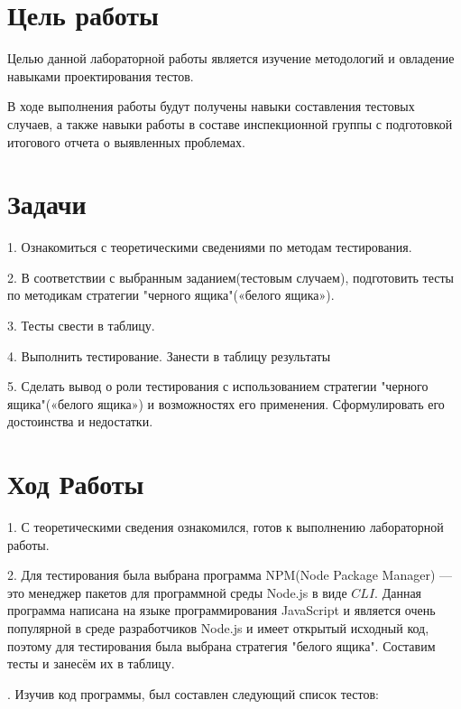 \documentclass[12pt]{article}
\begin{document}
    \section*{Цель работы}

    Целью данной лабораторной работы является изучение методологий и овладение навыками проектирования тестов.

    В ходе выполнения работы будут получены навыки составления тестовых случаев, а также навыки работы в составе инспекционной группы с подготовкой итогового отчета о выявленных проблемах.

    \section*{Задачи}

    1. Ознакомиться с теоретическими сведениями по методам тестирования.

    2. В соответствии с выбранным заданием(тестовым случаем), подготовить тесты по методикам стратегии "черного ящика"(«белого ящика»).

    3. Тесты свести в таблицу.

    4. Выполнить тестирование. Занести в таблицу результаты

    5. Сделать вывод о роли тестирования с использованием стратегии "черного ящика"(«белого ящика») и возможностях его применения. Сформулировать его достоинства и недостатки.

    \section*{Ход Работы}
    1. С теоретическими сведения ознакомился, готов к выполнению лабораторной работы.

    2. Для тестирования была выбрана программа NPM(Node Package Manager) --- это менеджер пакетов для программной среды Node.js в виде $CLI$. Данная программа написана на языке программирования JavaScript и является очень популярной в среде разработчиков Node.js и имеет открытый исходный код, поэтому для тестирования была выбрана стратегия "белого ящика". Составим тесты и занесём их в таблицу.

    . Изучив код программы, был составлен следующий список тестов:
\end{document}
